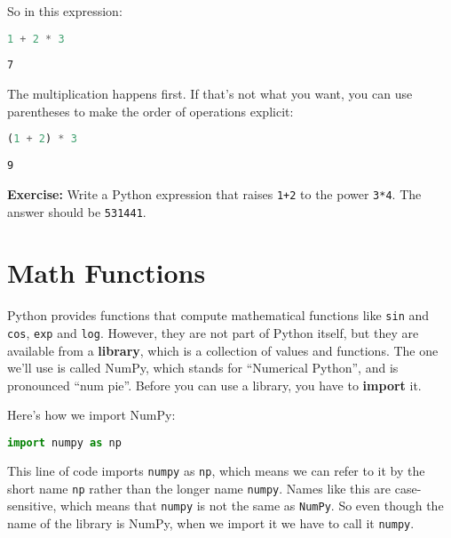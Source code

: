 So in this expression:

\begin{lstlisting}[language=Python,style=source]
1 + 2 * 3
\end{lstlisting}

\begin{lstlisting}[style=output]
7
\end{lstlisting}

The multiplication happens first. If that's not what you want, you can
use parentheses to make the order of operations explicit:

\begin{lstlisting}[language=Python,style=source]
(1 + 2) * 3
\end{lstlisting}

\begin{lstlisting}[style=output]
9
\end{lstlisting}

\textbf{Exercise:} Write a Python expression that raises
\passthrough{\lstinline!1+2!} to the power
\passthrough{\lstinline!3*4!}. The answer should be
\passthrough{\lstinline!531441!}.

\section{Math Functions}\label{math-functions}

Python provides functions that compute mathematical functions like
\passthrough{\lstinline!sin!} and \passthrough{\lstinline!cos!},
\passthrough{\lstinline!exp!} and \passthrough{\lstinline!log!}.
However, they are not part of Python itself, but they are available from
a \textbf{library}, which is a collection of values and functions. The
one we'll use is called NumPy, which stands for ``Numerical Python'',
and is pronounced ``num pie''. Before you can use a library, you have to
\textbf{import} it.

\pagebreak

Here's how we import NumPy:

\begin{lstlisting}[language=Python,style=source]
import numpy as np
\end{lstlisting}

This line of code imports \passthrough{\lstinline!numpy!} as
\passthrough{\lstinline!np!}, which means we can refer to it by the
short name \passthrough{\lstinline!np!} rather than the longer name
\passthrough{\lstinline!numpy!}. Names like this are case-sensitive,
which means that \passthrough{\lstinline!numpy!} is not the same as
\passthrough{\lstinline!NumPy!}. So even though the name of the library
is NumPy, when we import it we have to call it
\passthrough{\lstinline!numpy!}.

